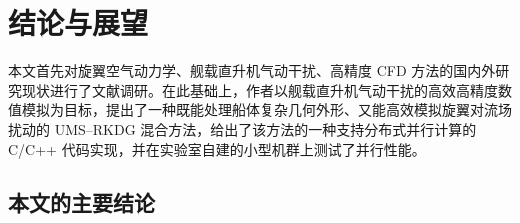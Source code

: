 
\chapter*{结论与展望}


本文首先对旋翼空气动力学、舰载直升机气动干扰、高精度 CFD 方法的国内外研究现状进行了文献调研。在此基础上，作者以舰载直升机气动干扰的高效高精度数值模拟为目标，提出了一种既能处理船体复杂几何外形、又能高效模拟旋翼对流场扰动的
UMS–RKDG 混合方法，给出了该方法的一种支持分布式并行计算的 C/C++ 代码实现，并在实验室自建的小型机群上测试了并行性能。

\section*{本文的主要结论}
